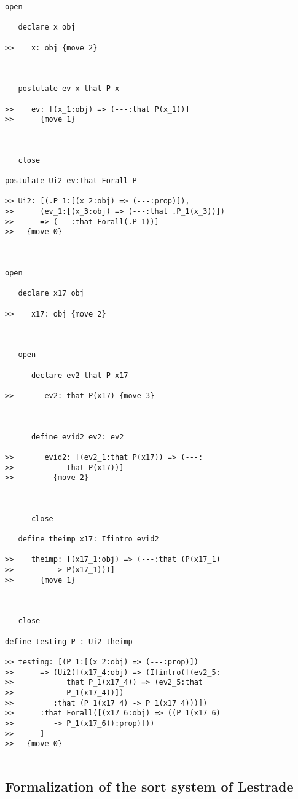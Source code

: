 \documentclass[12pt]{article}
\begin{document}
\begin{verbatim}
open

   declare x obj

>>    x: obj {move 2}



   postulate ev x that P x

>>    ev: [(x_1:obj) => (---:that P(x_1))]
>>      {move 1}



   close

postulate Ui2 ev:that Forall P

>> Ui2: [(.P_1:[(x_2:obj) => (---:prop)]),
>>      (ev_1:[(x_3:obj) => (---:that .P_1(x_3))])
>>      => (---:that Forall(.P_1))]
>>   {move 0}



open

   declare x17 obj

>>    x17: obj {move 2}



   open

      declare ev2 that P x17

>>       ev2: that P(x17) {move 3}



      define evid2 ev2: ev2

>>       evid2: [(ev2_1:that P(x17)) => (---:
>>            that P(x17))]
>>         {move 2}



      close

   define theimp x17: Ifintro evid2

>>    theimp: [(x17_1:obj) => (---:that (P(x17_1)
>>         -> P(x17_1)))]
>>      {move 1}



   close

define testing P : Ui2 theimp

>> testing: [(P_1:[(x_2:obj) => (---:prop)])
>>      => (Ui2([(x17_4:obj) => (Ifintro([(ev2_5:
>>            that P_1(x17_4)) => (ev2_5:that
>>            P_1(x17_4))])
>>         :that (P_1(x17_4) -> P_1(x17_4)))])
>>      :that Forall([(x17_6:obj) => ((P_1(x17_6)
>>         -> P_1(x17_6)):prop)]))
>>      ]
>>   {move 0}


\end{verbatim}

\newpage

\subsection{Formalization of the sort system of Lestrade}
\end{document}
